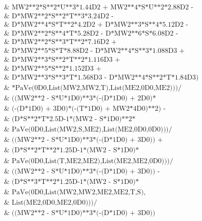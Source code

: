 \documentclass[../FeynCalcManual.tex]{subfiles}
\begin{document}
\begin{dmath*}
\begin{array}{l}
 \;\text{     $\&$       MW2**2*S**2*U**3*1.44D2 + MW2**4*S*U**2*2.88D2 - } \\
 \;\text{     $\&$       D*MW2**2*S**2*T**3*3.24D2 - } \\
 \;\text{     $\&$       D*MW2**4*S*T**2*4.2D2 + D*MW2**3*S**4*5.12D2 - } \\
 \;\text{     $\&$       D*MW2**2*S**4*T*5.28D2 - D*MW2**6*S*6.08D2 - } \\
 \;\text{     $\&$       D*MW2**2*S**3*T**2*7.16D2 + } \\
 \;\text{     $\&$       D*MW2**5*S*T*8.88D2 - D*MW2**4*S**3*1.088D3 + } \\
 \;\text{     $\&$       D*MW2**3*S**2*T**2*1.116D3 + } \\
 \;\text{     $\&$       D*MW2**5*S**2*1.152D3 + } \\
 \;\text{     $\&$       D*MW2**3*S**3*T*1.568D3 - D*MW2**4*S**2*T*1.84D3)} \\
 \;\text{     $\&$      *PaVe(0D0,List(MW2,MW2,T),List(ME2,0D0,ME2)))/} \\
 \;\text{     $\&$   ((MW2**2 - S*U*1D0)**3*(-(D*1D0) + 2D0)*} \\
 \;\text{     $\&$     (-(D*1D0) + 3D0)*(-(T*1D0) + MW2*4D0)**2) - } \\
 \;\text{     $\&$  (D*S**2*T*2.5D-1*(MW2 - S*1D0)**2*} \\
 \;\text{     $\&$     PaVe(0D0,List(MW2,S,ME2),List(ME2,0D0,0D0)))/} \\
 \;\text{     $\&$   ((MW2**2 - S*U*1D0)**3*(-(D*1D0) + 3D0)) + } \\
 \;\text{     $\&$  (D*S**2*T**2*1.25D-1*(MW2 - S*1D0)*} \\
 \;\text{     $\&$     PaVe(0D0,List(T,ME2,ME2),List(ME2,ME2,0D0)))/} \\
 \;\text{     $\&$   ((MW2**2 - S*U*1D0)**3*(-(D*1D0) + 3D0)) - } \\
 \;\text{     $\&$  (D*S**3*T**2*1.25D-1*(MW2 - S*1D0)*} \\
 \;\text{     $\&$     PaVe(0D0,List(MW2,MW2,ME2,ME2,T,S),} \\
 \;\text{     $\&$      List(ME2,0D0,ME2,0D0)))/} \\
 \;\text{     $\&$   ((MW2**2 - S*U*1D0)**3*(-(D*1D0) + 3D0))} \\
\end{array}
\end{dmath*}
\end{document}
